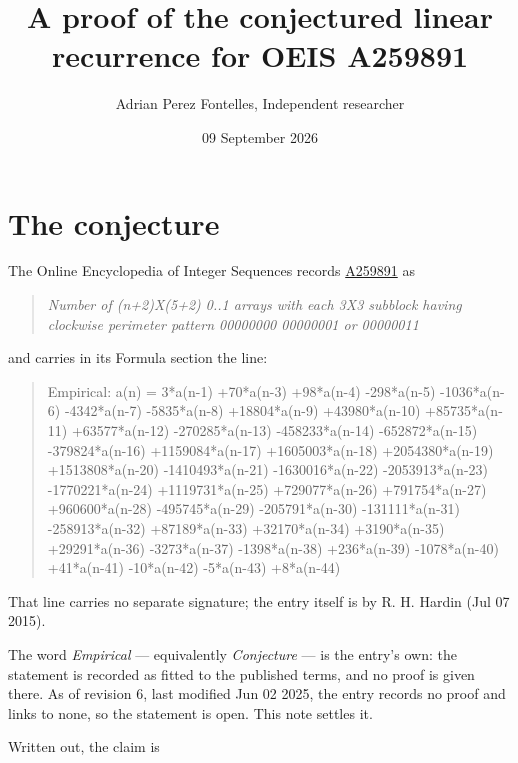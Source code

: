 \documentclass[11pt]{article}
\title{A proof of the conjectured linear recurrence for OEIS A259891}
\author{Adrian Perez Fontelles, Independent researcher}
\date{09 September 2026}
\theoremstyle{definition}
\begin{document}
\maketitle
\section{The conjecture}

The Online Encyclopedia of Integer Sequences records \href{https://oeis.org/A259891}{A259891} as

\begin{quote}\itshape Number of (n+2)X(5+2) 0..1 arrays with each 3X3 subblock having clockwise perimeter pattern 00000000 00000001 or 00000011\end{quote}

and carries in its Formula section the line:

\begin{quote}\ttfamily Empirical: a(n) = 3*a(n-1) +70*a(n-3) +98*a(n-4) -298*a(n-5) -1036*a(n-6) -4342*a(n-7) -5835*a(n-8) +18804*a(n-9) +43980*a(n-10) +85735*a(n-11) +63577*a(n-12) -270285*a(n-13) -458233*a(n-14) -652872*a(n-15) -379824*a(n-16) +1159084*a(n-17) +1605003*a(n-18) +2054380*a(n-19) +1513808*a(n-20) -1410493*a(n-21) -1630016*a(n-22) -2053913*a(n-23) -1770221*a(n-24) +1119731*a(n-25) +729077*a(n-26) +791754*a(n-27) +960600*a(n-28) -495745*a(n-29) -205791*a(n-30) -131111*a(n-31) -258913*a(n-32) +87189*a(n-33) +32170*a(n-34) +3190*a(n-35) +29291*a(n-36) -3273*a(n-37) -1398*a(n-38) +236*a(n-39) -1078*a(n-40) +41*a(n-41) -10*a(n-42) -5*a(n-43) +8*a(n-44)\end{quote}

That line carries no separate signature; the entry itself is by R. H. Hardin (Jul 07 2015).

The word {\itshape Empirical} --- equivalently {\itshape Conjecture} --- is the entry's own: the statement is recorded as fitted to the published terms, and no proof is given there. As of revision 6, last modified Jun 02 2025, the entry records no proof and links to none, so the statement is open. This note settles it.

Written out, the claim is
\end{document}
